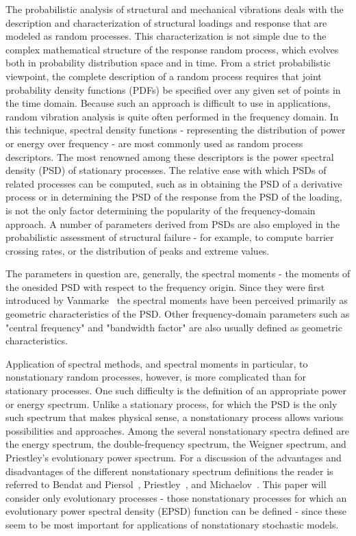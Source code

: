 \documentclass[12pt]{article}
\begin{document}
The probabilistic analysis of structural and mechanical vibrations deals with the description and characterization of structural loadings and response that are modeled as random processes. This characterization is not simple due to the complex mathematical structure of the response%
random process, which evolves both in probability distribution space and in time. From a strict probabilistic viewpoint, the complete description of a random process requires that joint probability density functions (PDFs) be specified over any given set of points in the time domain. Because such an approach is difficult to use in applications, random vibration analysis is quite often performed in the frequency domain. In this technique, spectral density functions - representing the distribution of power or energy over frequency - are most commonly used as random process descriptors. The most renowned among these descriptors is the power spectral density (PSD) of stationary processes. The relative ease with which PSDs of related processes can be computed, such as in obtaining the PSD of a derivative process or in determining the PSD of the response from the PSD of the loading, is not the only factor determining the popularity of the frequency-domain approach. A number of parameters derived from PSDs are also employed in the probabilistic assessment of structural failure - for example, to compute barrier crossing rates, or the distribution of peaks and extreme values.

The parameters in question are, generally, the spectral moments - the moments of the onesided PSD with respect to the frequency origin. Since they were first introduced by Vanmarke~\cite{Vanmarke1972} the spectral moments have been perceived primarily as geometric characteristics of the PSD. Other frequency-domain parameters such as "central frequency" and "bandwidth factor" are also usually defined as geometric characteristics.

Application of spectral methods, and spectral moments in particular, to nonstationary random processes, however, is more complicated than for stationary processes. One such difficulty is the definition of an appropriate power or energy spectrum. Unlike a stationary process, for which the PSD is the only such spectrum that makes physical sense, a nonstationary process allows various possibilities and approaches. Among the several nonstationary spectra defined are the energy spectrum, the double-frequency spectrum, the Weigner spectrum, and Priestley's evolutionary power spectrum. For a discussion of the advantages and disadvantages of the different nonstationary spectrum definitions the reader is referred to Bendat and Piersol~\cite{BendatPiersol1986}, Priestley~\cite{Priestley1988}, and Michaelov~\cite{Michaelov1997}. This paper will consider only evolutionary processes - those nonstationary processes for which an evolutionary power spectral density (EPSD) function can be defined - since these seem to be most important for applications of nonstationary stochastic models.
\end{document}
